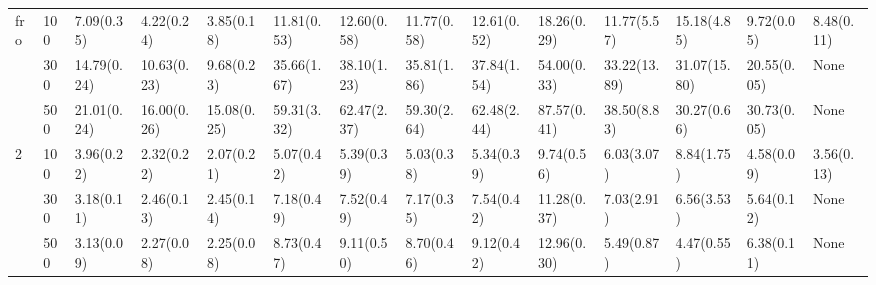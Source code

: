 \begin{longtable}{lll|p{1cm}p{1cm}p{1cm}p{1cm}p{1cm}p{1cm}p{1cm}p{1cm}p{1cm}}
\bottomrule
\endlastfoot
fro & 100 &       7.09(0.35) &       4.22(0.24) &     3.85(0.18) &                                11.81(0.53) &                               12.60(0.58) &                               11.77(0.58) &                              12.61(0.52) &  18.26(0.29) &    11.77(5.57) &    15.18(4.85) &    9.72(0.05) &       8.48(0.11) \\
  & 300 &      14.79(0.24) &      10.63(0.23) &     9.68(0.23) &                                35.66(1.67) &                               38.10(1.23) &                               35.81(1.86) &                              37.84(1.54) &  54.00(0.33) &   33.22(13.89) &   31.07(15.80) &   20.55(0.05) &             None \\
  & 500 &      21.01(0.24) &      16.00(0.26) &    15.08(0.25) &                                59.31(3.32) &                               62.47(2.37) &                               59.30(2.64) &                              62.48(2.44) &  87.57(0.41) &    38.50(8.83) &    30.27(0.66) &   30.73(0.05) &             None \\
2 & 100 &       3.96(0.22) &       2.32(0.22) &     2.07(0.21) &                                 5.07(0.42) &                                5.39(0.39) &                                5.03(0.38) &                               5.34(0.39) &   9.74(0.56) &     6.03(3.07) &     8.84(1.75) &    4.58(0.09) &       3.56(0.13) \\
  & 300 &       3.18(0.11) &       2.46(0.13) &     2.45(0.14) &                                 7.18(0.49) &                                7.52(0.49) &                                7.17(0.35) &                               7.54(0.42) &  11.28(0.37) &     7.03(2.91) &     6.56(3.53) &    5.64(0.12) &             None \\
  & 500 &       3.13(0.09) &       2.27(0.08) &     2.25(0.08) &                                 8.73(0.47) &                                9.11(0.50) &                                8.70(0.46) &                               9.12(0.42) &  12.96(0.30) &     5.49(0.87) &     4.47(0.55) &    6.38(0.11) &             None \\
\end{longtable}

